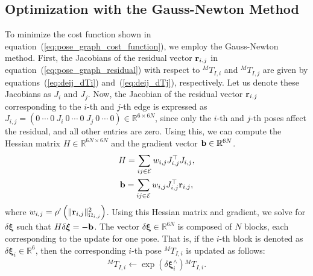 \subsection{Optimization with the Gauss-Newton Method}

To minimize the cost function shown in equation~(\ref{eq:pose_graph_cost_function}), we employ the Gauss-Newton method.
First, the Jacobians of the residual vector ${\bf r}_{i, j}$ in equation~(\ref{eq:pose_graph_residual}) with respect to ${}^{M}T_{I, i}$ and ${}^{M}T_{I, j}$ are given by equations~(\ref{eq:deij_dTi}) and~(\ref{eq:deij_dTj}), respectively.
Let us denote these Jacobians as $J_{i}$ and $J_{j}$.
Now, the Jacobian of the residual vector ${\bf r}_{i, j}$ corresponding to the $i$-th and $j$-th edge is expressed as
$J_{i, j} = \left( 0 ~ \cdots ~ 0 ~ J_{i} ~ 0 ~ \cdots ~ 0 ~ J_{j} ~ 0 ~ \cdots ~ 0 \right) \in \mathbb{R}^{6 \times 6N}$,
since only the $i$-th and $j$-th poses affect the residual, and all other entries are zero.
Using this, we can compute the Hessian matrix $H \in \mathbb{R}^{6N \times 6N}$ and the gradient vector ${\bf b} \in \mathbb{R}^{6N}$.
%
\begin{align}
  \begin{gathered}
    H = \sum_{ ij \in \mathcal{E} } w_{i, j} J_{i, j}^{\top} J_{i, j}, \\
    {\bf b} = \sum_{ ij \in \mathcal{E} } w_{i, j} J_{i, j}^{\top} {\bf r}_{i, j}, \\
  \end{gathered}
  \label{eq:graph_slam_hessian_gradient}
\end{align}
%
where $w_{i, j} = \rho^{\prime} \left( \| {\bf r}_{i, j} \|_{ \Omega_{i, j} }^{2} \right)$.
Using this Hessian matrix and gradient, we solve for $\delta \boldsymbol \xi$ such that $H \delta \boldsymbol \xi = -{\bf b}$.
The vector $\delta \boldsymbol \xi \in \mathbb{R}^{6N}$ is composed of $N$ blocks, each corresponding to the update for one pose.
That is, if the $i$-th block is denoted as $\delta \boldsymbol \xi_{i} \in \mathbb{R}^{6}$, then the corresponding $i$-th pose ${}^{M}T_{I, i}$ is updated as follows:
%
\begin{align}
  {}^{M}T_{I, i} \leftarrow \exp \left( \delta \boldsymbol \xi_{i}^{\wedge} \right) {}^{M}T_{I, i}.
\end{align}
%

